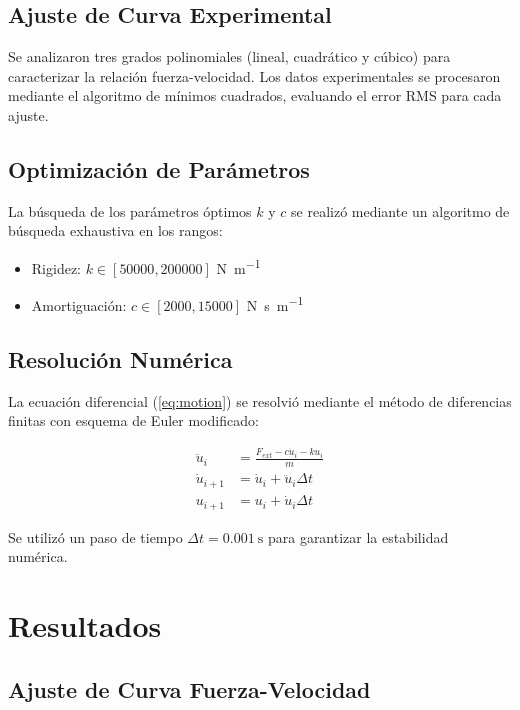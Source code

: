 \documentclass[journal]{IEEEtran}
\begin{document}
\subsection{Ajuste de Curva Experimental}

Se analizaron tres grados polinomiales (lineal, cuadrático y cúbico) para caracterizar la relación fuerza-velocidad. Los datos experimentales se procesaron mediante el algoritmo de mínimos cuadrados, evaluando el error RMS para cada ajuste.

\subsection{Optimización de Parámetros}

La búsqueda de los parámetros óptimos $k$ y $c$ se realizó mediante un algoritmo de búsqueda exhaustiva en los rangos:
\begin{itemize}
\item Rigidez: $k \in [50000, 200000]$ \si{\newton\per\meter}
\item Amortiguación: $c \in [2000, 15000]$ \si{\newton\second\per\meter}
\end{itemize}

\subsection{Resolución Numérica}

La ecuación diferencial (\ref{eq:motion}) se resolvió mediante el método de diferencias finitas con esquema de Euler modificado:

\begin{align}
\ddot{u}_i &= \frac{F_{ext} - c\dot{u}_i - ku_i}{m} \label{eq:acceleration}\\
\dot{u}_{i+1} &= \dot{u}_i + \ddot{u}_i \Delta t \label{eq:velocity_update}\\
u_{i+1} &= u_i + \dot{u}_i \Delta t \label{eq:displacement_update}
\end{align}

Se utilizó un paso de tiempo $\Delta t = \SI{0.001}{\second}$ para garantizar la estabilidad numérica.

\section{Resultados}

\subsection{Ajuste de Curva Fuerza-Velocidad}
\end{document}
